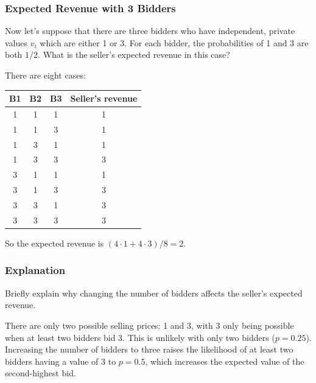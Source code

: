 \documentclass[newpages, arabicsubsec]{assignment}
\begin{document}
\subsubsection{Expected Revenue with 3 Bidders}
\begin{problem}
Now let's suppose that there are three bidders who have independent, private values \(v_i\) which are either 1 or 3. For each bidder, the probabilities of 1 and 3 are both \(1/2\). What is the seller's expected revenue in this case?
\end{problem}
\begin{solution}
    There are eight cases:
    \begin{center}
        \begin{tabular}{cccc}
            \toprule
            B1 & B2 & B3 & Seller's revenue \\
            \midrule
            1  & 1  & 1  & 1                \\
            1  & 1  & 3  & 1                \\
            1  & 3  & 1  & 1                \\
            1  & 3  & 3  & 3                \\
            3  & 1  & 1  & 1                \\
            3  & 1  & 3  & 3                \\
            3  & 3  & 1  & 3                \\
            3  & 3  & 3  & 3                \\
            \bottomrule
        \end{tabular}
    \end{center}
    So the expected revenue is $(4 \cdot 1 + 4 \cdot 3) / 8 = 2$.
\end{solution}

\subsubsection{Explanation}
\begin{problem}
Briefly explain why changing the number of bidders affects the seller's expected revenue.
\end{problem}
\begin{solution}
    There are only two possible selling prices: 1 and 3, with 3 only being possible when at least two bidders bid 3. This is unlikely with only two bidders ($p = 0.25$). Increasing the number of bidders to three raises the likelihood of at least two bidders having a value of 3 to \(p=0.5\), which increases the expected value of the second-highest bid.
\end{solution}
\end{document}
